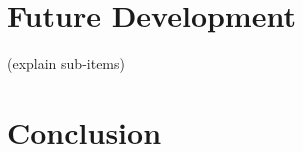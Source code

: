\documentclass[11pt,a4paper]{article}
\begin{document}
\section{Future Development}
\label{sec:future-development}
(explain sub-items)

\section{Conclusion}
\label{sec:conclusion}
\end{document}
